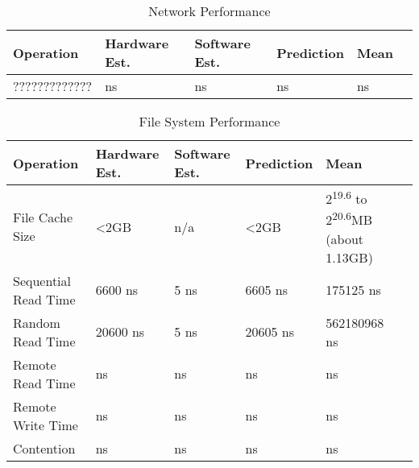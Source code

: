 \documentclass{article} %
\begin{document}
\begin{table}[!htbp]
  \caption{Network Performance}
  \begin{tabular}{|l|l|l|l|l|l|}
    \hline
    Operation               & Hardware Est.         & Software Est.         & Prediction            & Mean     \\ \hline
    ?????????????           & ns                    & ns                    & ns                    & ns\\ \hline
  \end{tabular}
\label{table:overview_network}
\end{table}

\begin{table}[!htbp]
  \caption{File System Performance}
  \begin{tabular}{|l|l|l|l|l|l|}
    \hline
    Operation               & Hardware Est.         & Software Est.         & Prediction            & Mean     \\ \hline
    File Cache Size         & \textless2GB          & n/a                   & \textless2GB          & 2\textsuperscript{19.6} to 2\textsuperscript{20.6}MB (about 1.13GB)\\ \hline
    Sequential Read Time    & 6600 ns               & 5 ns                  & 6605 ns               & 175125 ns\\ \hline
    Random Read Time        & 20600 ns              & 5 ns                  & 20605 ns              & 562180968 ns\\ \hline
    Remote Read Time        & ns                    & ns                    & ns                    & ns\\ \hline
    Remote Write Time       & ns                    & ns                    & ns                    & ns\\ \hline
    Contention              & ns                    & ns                    & ns                    & ns\\ \hline
  \end{tabular}
\label{table:overview_file}
\end{table}
\end{document}
